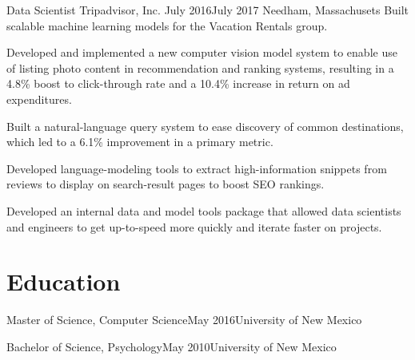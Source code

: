 \documentclass[print]{ag-cv} %
\begin{document}
\begin{job}
  {Data Scientist}
  {Tripadvisor, Inc.}
  {July 2016}{July 2017}
  {Needham, Massachusets}
  {
  Built scalable machine learning models for the Vacation Rentals group.
  }
  {
  \begin{myitemize}
    \item Developed and implemented a new computer vision model system to enable
    use of listing photo content in recommendation and ranking systems,
    resulting in a 4.8\% boost to click-through rate and a 10.4\% increase in
    return on ad expenditures.

    \item Built a natural-language query system to ease discovery of common 
    destinations, which led to a 6.1\% improvement in a primary metric.
    
    \item Developed language-modeling tools to extract high-information snippets
    from reviews to display on search-result pages to boost SEO rankings.
    
    \item Developed an internal data and model tools package that allowed data
    scientists and engineers to get up-to-speed more quickly and iterate faster
    on projects.
\end{myitemize}
}
\end{job}


\section*{Education}
  \begin{edu}{Master of Science, Computer Science}{May 2016}{University of New Mexico}
  \end{edu}
  \begin{edu}{Bachelor of Science, Psychology}{May 2010}{University of New Mexico}
  \end{edu}


\end{document}
